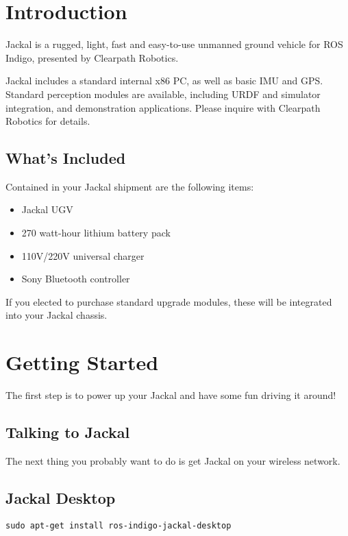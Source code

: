 \documentclass[]{article}
\begin{document}
\thispagestyle{empty}

\tableofcontents

\section{Introduction}

Jackal is a rugged, light, fast and easy-to-use unmanned ground vehicle for ROS Indigo, presented
by Clearpath Robotics.

Jackal includes a standard internal x86 PC, as well as basic IMU and GPS. Standard perception
modules are available, including URDF and simulator integration, and demonstration applications.
Please inquire with Clearpath Robotics for details.

\subsection{What's Included}

Contained in your Jackal shipment are the following items:

\begin{itemize}
  \item Jackal UGV
  \item 270 watt-hour lithium battery pack
  \item 110V/220V universal charger
  \item Sony Bluetooth controller
\end{itemize}

If you elected to purchase standard upgrade modules, these will be integrated into your Jackal chassis.

\section{Getting Started}

The first step is to power up your Jackal and have some fun driving it around!

\subsection{Talking to Jackal}

The next thing you probably want to do is get Jackal on your wireless network.

\subsection{Jackal Desktop}

\begin{lstlisting}
sudo apt-get install ros-indigo-jackal-desktop
\end{lstlisting}
\end{document}
